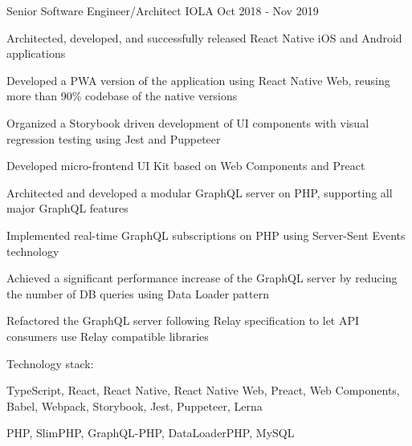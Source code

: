 \begin{cventries}
  \cventry
    {Senior Software Engineer/Architect} %
    {IOLA} %
    {} %
    {Oct 2018 - Nov 2019} %
    {
      \begin{cvitems}
        \item Architected, developed, and successfully released React Native iOS and Android applications
        \item Developed a PWA version of the application using React Native Web, reusing more than 90\% codebase of the native versions
        \item Organized a Storybook driven development of UI components with visual regression testing using Jest and Puppeteer
        \item Developed micro-frontend UI Kit based on Web Components and Preact
        \item Architected and developed a modular GraphQL server on PHP, supporting all major GraphQL features
        \item Implemented real-time GraphQL subscriptions on PHP using Server-Sent Events technology
        \item Achieved a significant performance increase of the GraphQL server by reducing the number of DB queries using Data Loader pattern
        \item Refactored the GraphQL server following Relay specification to let API consumers use Relay compatible libraries
      \end{cvitems}
      \vspace{5mm}
      Technology stack:
      \begin{cvstackitems}
        \item TypeScript, React, React Native, React Native Web, Preact, Web Components, Babel, Webpack, Storybook, Jest, Puppeteer, Lerna
        \item PHP, SlimPHP, GraphQL-PHP, DataLoaderPHP, MySQL
      \end{cvstackitems}
      \vspace{-2.0mm}
    }


\end{cventries}
